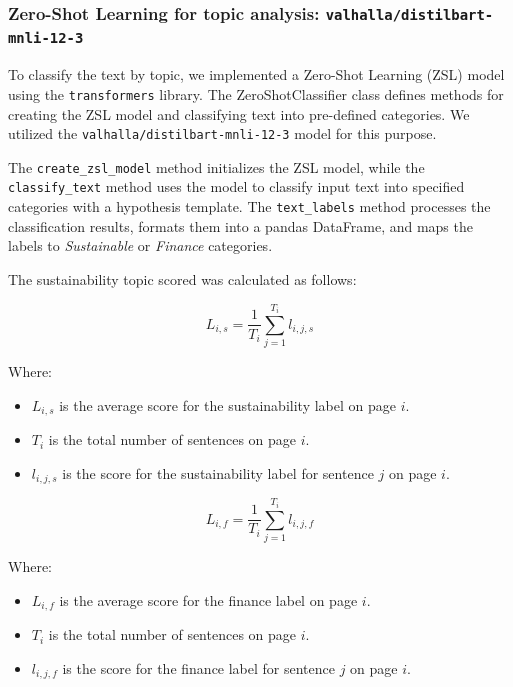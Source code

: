 \documentclass[times]{oupau}
\begin{document}
\subsubsection{Zero-Shot Learning for topic analysis: \texttt{valhalla/distilbart-mnli-12-3}}
To classify the text by topic, we implemented a Zero-Shot Learning (ZSL) model using the \texttt{transformers} library. The ZeroShotClassifier class defines methods for creating the ZSL model and classifying text into pre-defined categories. We utilized the \texttt{valhalla/distilbart-mnli-12-3} model for this purpose.
\par
\justify

The \texttt{create\_zsl\_model} method initializes the ZSL model, while the \texttt{classify\_text} method uses the model to classify input text into specified categories with a hypothesis template. The \texttt{text\_labels} method processes the classification results, formats them into a pandas DataFrame, and maps the labels to \textit{Sustainable} or \textit{Finance} categories.
\par
\justify
The sustainability topic scored was calculated as follows:

\begin{equation}
L_{i,s} = \frac{1}{T_i} \sum_{j=1}^{T_i} l_{i,j,s}
\end{equation}

Where:
\begin{itemize}
  \item $L_{i,s}$ is the average score for the sustainability label on page $i$.
  \item $T_i$ is the total number of sentences on page $i$.
  \item $l_{i,j,s}$ is the score for the sustainability label for sentence $j$ on page $i$.
\end{itemize}

\begin{equation}
L_{i,f} = \frac{1}{T_i} \sum_{j=1}^{T_i} l_{i,j,f}
\end{equation}

Where:
\begin{itemize}
  \item $L_{i,f}$ is the average score for the finance label on page $i$.
  \item $T_i$ is the total number of sentences on page $i$.
  \item $l_{i,j,f}$ is the score for the finance label for sentence $j$ on page $i$.
\end{itemize}
\end{document}

